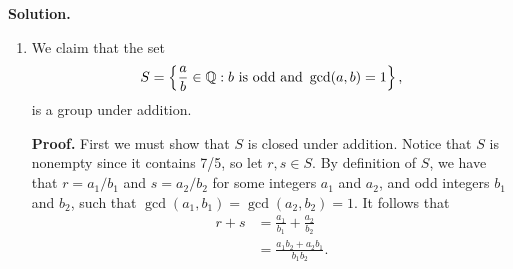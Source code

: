 \begin{enumerate}
      \textbf{Solution.}

      \begin{enumerate}
         \item We claim that the set
               $$S = \left\{\frac{a}{b} \in \mathbb{Q} : b \text{ is odd} \text{ and }
                 \gcd(a, b) = 1\right\},$$
               is a group under addition.

               \textbf{Proof.} First we must show that $S$ is closed under 
               addition. Notice that $S$ is nonempty since it contains 7/5, so 
               let $r, s \in S$. By definition of $S$, we have that
               $r = a_1/b_1$ and $s = a_2/b_2$ for some integers $a_1$ and
               $a_2$, and odd integers $b_1$ and $b_2$, such that
               $\gcd(a_1, b_1) = \gcd(a_2, b_2) = 1$. It follows that
               \begin{align*}
                  r + s &= \frac{a_1}{b_1} + \frac{a_2}{b_2} \\
                        &= \frac{a_1b_2 + a_2b_1}{b_1b_2}.
               \end{align*}


\end{enumerate}
\end{enumerate}
